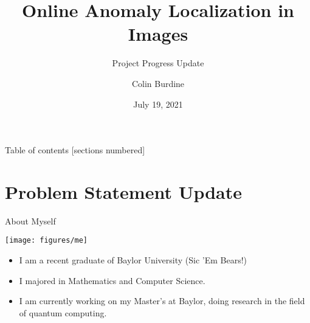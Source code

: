 \documentclass[10pt]{beamer}
\title{Online Anomaly Localization in Images}
\subtitle{Project Progress Update}
\date{July 19, 2021}
\author{Colin Burdine}
\institute{SULI Intern, Hosted at Argonne National Laboratory}
\begin{document}
\maketitle

\begin{frame}{Table of contents}
[sections numbered]
\tableofcontents%
\end{frame}

\section{Problem Statement Update}

\begin{frame}{About Myself}
\begin{center}
\texttt{[image: figures/me]}
\end{center}
\begin{itemize}
\item I am a recent graduate of Baylor University (Sic 'Em Bears!)
\item I majored in Mathematics and Computer Science.
\item I am currently working on my Master's at Baylor, doing research in the field of quantum computing.
\end{itemize}
\end{frame}
\end{document}
